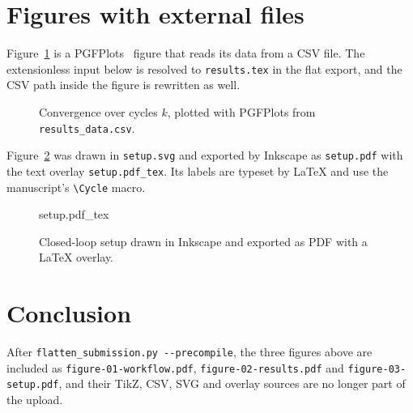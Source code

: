 \documentclass[a4paper,fleqn]{cas-dc}
\newcommand{\Cycle}{k}
\begin{document}
\section{Figures with external files}

Figure~\ref{fig:results} is a PGFPlots~\citep{feuersanger2021pgfplots} figure that reads its data from a CSV file. The extensionless input below is resolved to \texttt{results.tex} in the flat export, and the CSV path inside the figure is rewritten as well.

\begin{figure}[t]
\centering

\caption{Convergence over cycles $\Cycle$, plotted with PGFPlots from \texttt{results\_data.csv}.}
\label{fig:results}
\end{figure}

Figure~\ref{fig:setup} was drawn in \texttt{setup.svg} and exported by Inkscape as \texttt{setup.pdf} with the text overlay \texttt{setup.pdf\_tex}. Its labels are typeset by \LaTeX{} and use the manuscript's \verb|\Cycle| macro.

\begin{figure}[t]
\centering
\def\svgwidth{\columnwidth}
{setup.pdf_tex}
\caption{Closed-loop setup drawn in Inkscape and exported as PDF with a \LaTeX{} overlay.}
\label{fig:setup}
\end{figure}

\section{Conclusion}

After \verb|flatten_submission.py --precompile|, the three figures above are included as \texttt{figure-01-workflow.pdf}, \texttt{figure-02-results.pdf} and \texttt{figure-03-setup.pdf}, and their TikZ, CSV, SVG and overlay sources are no longer part of the upload.



\end{document}
